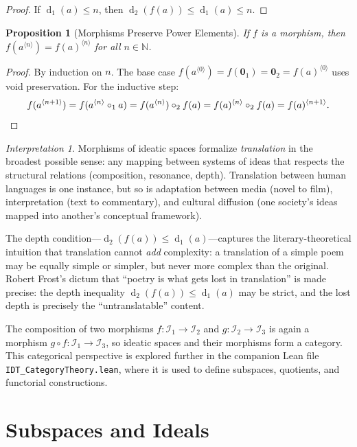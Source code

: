 \documentclass[11pt,openany]{book}
\theoremstyle{definition}
\theoremstyle{plain}
\newtheorem{proposition}[axiom]{Proposition}
\theoremstyle{remark}
\newtheorem{interpretation}[axiom]{Interpretation}
\newcommand{\IS}{\mathcal{I}}               %
\newcommand{\compose}{\circ}                 %
\newcommand{\void}{\mathbf{0}}              %
\newcommand{\depth}{\operatorname{d}}       %
\newcommand{\compN}[2]{#1^{\langle #2 \rangle}} %
\begin{document}
\begin{proof}
If $\depth_1(a) \leq n$, then $\depth_2(f(a)) \leq \depth_1(a) \leq n$.
\end{proof}

\begin{proposition}[Morphisms Preserve Power Elements]
If $f$ is a morphism, then $f(\compN{a}{n}) = \compN{f(a)}{n}$ for all $n \in \mathbb{N}$.
\end{proposition}

\begin{proof}
By induction on $n$. The base case $f(\compN{a}{0}) = f(\void_1) = \void_2 = \compN{f(a)}{0}$ uses void preservation. For the inductive step:
\[
f(\compN{a}{n+1}) = f(\compN{a}{n} \compose_1 a) = f(\compN{a}{n}) \compose_2 f(a) = \compN{f(a)}{n} \compose_2 f(a) = \compN{f(a)}{n+1}. \qedhere
\]
\end{proof}

\begin{interpretation}
Morphisms of ideatic spaces formalize \emph{translation} in the broadest possible sense: any mapping between systems of ideas that respects the structural relations (composition, resonance, depth). Translation between human languages is one instance, but so is adaptation between media (novel to film), interpretation (text to commentary), and cultural diffusion (one society's ideas mapped into another's conceptual framework).

The depth condition---$\depth_2(f(a)) \leq \depth_1(a)$---captures the literary-theoretical intuition that translation cannot \emph{add} complexity: a translation of a simple poem may be equally simple or simpler, but never more complex than the original. Robert Frost's dictum that ``poetry is what gets lost in translation'' is made precise: the depth inequality $\depth_2(f(a)) \leq \depth_1(a)$ may be strict, and the lost depth is precisely the ``untranslatable'' content.

The composition of two morphisms $f : \IS_1 \to \IS_2$ and $g : \IS_2 \to \IS_3$ is again a morphism $g \circ f : \IS_1 \to \IS_3$, so ideatic spaces and their morphisms form a category. This categorical perspective is explored further in the companion Lean file \texttt{IDT\_CategoryTheory.lean}, where it is used to define subspaces, quotients, and functorial constructions.
\end{interpretation}

\section{Subspaces and Ideals}
\end{document}
